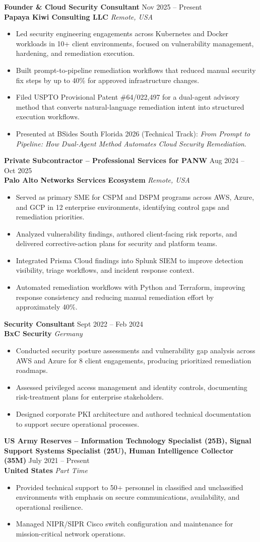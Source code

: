 \documentclass[10pt,letterpaper]{article}
\newcommand{\ri}[1]{\item #1}
\newcommand{\rs}[4]{
  {\color{accent}\bfseries\fontsize{11pt}{12.5pt}\selectfont #1} \hfill #2 \\
  {\color{accent}\textbf{#3}} \hfill \textit{#4} \\
  \vspace{-3pt}
}
\begin{document}
\rs{Founder \& Cloud Security Consultant}{Nov 2025 -- Present}{Papaya Kiwi Consulting LLC}{Remote, USA}
\begin{itemize}
  \ri{Led security engineering engagements across Kubernetes and Docker workloads in 10+ client environments, focused on vulnerability management, hardening, and remediation execution.}
  \ri{Built prompt-to-pipeline remediation workflows that reduced manual security fix steps by up to 40\% for approved infrastructure changes.}
  \ri{Filed USPTO Provisional Patent \#64/022,497 for a dual-agent advisory method that converts natural-language remediation intent into structured execution workflows.}
  \ri{Presented at BSides South Florida 2026 (Technical Track): \textit{From Prompt to Pipeline: How Dual-Agent Method Automates Cloud Security Remediation}.}
\end{itemize}

\rs{Private Subcontractor -- Professional Services for PANW}{Aug 2024 -- Oct 2025}{Palo Alto Networks Services Ecosystem}{Remote, USA}
\begin{itemize}
  \ri{Served as primary SME for CSPM and DSPM programs across AWS, Azure, and GCP in 12 enterprise environments, identifying control gaps and remediation priorities.}
  \ri{Analyzed vulnerability findings, authored client-facing risk reports, and delivered corrective-action plans for security and platform teams.}
  \ri{Integrated Prisma Cloud findings into Splunk SIEM to improve detection visibility, triage workflows, and incident response context.}
  \ri{Automated remediation workflows with Python and Terraform, improving response consistency and reducing manual remediation effort by approximately 40\%.}
\end{itemize}

\rs{Security Consultant}{Sept 2022 -- Feb 2024}{BxC Security}{Germany}
\begin{itemize}
  \ri{Conducted security posture assessments and vulnerability gap analysis across AWS and Azure for 8 client engagements, producing prioritized remediation roadmaps.}
  \ri{Assessed privileged access management and identity controls, documenting risk-treatment plans for enterprise stakeholders.}
  \ri{Designed corporate PKI architecture and authored technical documentation to support secure operational processes.}
\end{itemize}

\rs{US Army Reserves -- Information Technology Specialist (25B), Signal Support Systems Specialist (25U), Human Intelligence Collector (35M)}{July 2021 -- Present}{United States}{Part Time}
\begin{itemize}
  \ri{Provided technical support to 50+ personnel in classified and unclassified environments with emphasis on secure communications, availability, and operational resilience.}
  \ri{Managed NIPR/SIPR Cisco switch configuration and maintenance for mission-critical network operations.}
\end{itemize}
\end{document}

